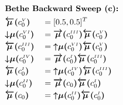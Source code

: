 \documentclass[fleqn]{article}
\begin{document}
\noindent
\setlength{\jot}{0.3em}
\begin{minipage}[t]{0.5\textwidth}
    \begin{alignat}{2}
         & \rlap{\text{\bfseries Bethe Backward Sweep (c):}} \nonumber                                                                                                                               \\
         & \bm{\overleftarrow{\mu}(}c^{\scriptscriptstyle V}_0\bm{)}   &  & = [0.5, 0.5]^T                                                                                                           \\
         & \bm{{\downarrow}{\mu}(}c^{\scriptscriptstyle VI}_0\bm{)}    &  & = \bm{\overrightarrow{\mu}(}c^{\scriptscriptstyle III}_0\bm{)} \bm{\overleftarrow{\mu}(}c^{\scriptscriptstyle V}_0\bm{)} \\
         & \bm{\overleftarrow{\mu}(}c^{\scriptscriptstyle III}_0\bm{)} &  & = \bm{{\uparrow}{\mu}(}c^{\scriptscriptstyle VI}_0\bm{)} \bm{\overleftarrow{\mu}(}c^{\scriptscriptstyle V}_0\bm{)}       \\
         & \bm{{\downarrow}{\mu}(}c^{\scriptscriptstyle IV}_0\bm{)}    &  & = \bm{\overrightarrow{\mu}(}c^{\scriptscriptstyle I}_0\bm{)} \bm{\overleftarrow{\mu}(}c^{\scriptscriptstyle III}_0\bm{)} \\
         & \bm{\overleftarrow{\mu}(}c^{\scriptscriptstyle I}_0\bm{)}   &  & = \bm{{\uparrow}{\mu}(}c^{\scriptscriptstyle IV}_0\bm{)} \bm{\overleftarrow{\mu}(}c^{\scriptscriptstyle III}_0\bm{)}     \\
         & \bm{{\downarrow}{\mu}(}c^{\scriptscriptstyle II}_0\bm{)}    &  & = \bm{\overrightarrow{\mu}(}c_0\bm{)} \bm{\overleftarrow{\mu}(}c^{\scriptscriptstyle I}_0\bm{)}                          \\
         & \bm{\overleftarrow{\mu}(}c_0\bm{)}                          &  & = \bm{{\uparrow}{\mu}(}c^{\scriptscriptstyle II}_0\bm{)} \bm{\overleftarrow{\mu}(}c^{\scriptscriptstyle I}_0\bm{)}       \\
    \end{alignat}
\end{minipage}
\end{document}
